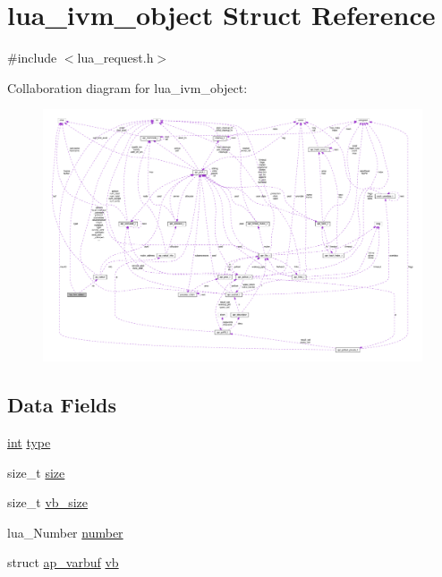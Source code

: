 \hypertarget{structlua__ivm__object}{}\section{lua\+\_\+ivm\+\_\+object Struct Reference}
\label{structlua__ivm__object}


{\ttfamily \#include $<$lua\+\_\+request.\+h$>$}



Collaboration diagram for lua\+\_\+ivm\+\_\+object\+:
\nopagebreak
\begin{figure}[H]
\begin{center}
\leavevmode
\includegraphics[width=350pt]{structlua__ivm__object__coll__graph}
\end{center}
\end{figure}
\subsection*{Data Fields}
\begin{DoxyCompactItemize}
\item 
\hyperlink{pcre_8txt_a42dfa4ff673c82d8efe7144098fbc198}{int} \hyperlink{structlua__ivm__object_af043819f9d295e36e57b00e2bbb7ac84}{type}
\item 
size\+\_\+t \hyperlink{structlua__ivm__object_a897654776e8c00d8035dd18e39b3a282}{size}
\item 
size\+\_\+t \hyperlink{structlua__ivm__object_aa095decb8709e04338ab36f1348320c6}{vb\+\_\+size}
\item 
lua\+\_\+\+Number \hyperlink{structlua__ivm__object_a5f60f74ff2fd6e1de96e05b6a90ceebd}{number}
\item 
struct \hyperlink{structap__varbuf}{ap\+\_\+varbuf} \hyperlink{structlua__ivm__object_a879f5ab9eb9ea85708526d9a53b5520e}{vb}
\end{DoxyCompactItemize}



